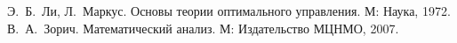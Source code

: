 


        
        
        \tableofcontents

        
        
        
        
        \begin{thebibliography}{9}
                Э.~Б.~Ли, Л.~Маркус. Основы теории оптимального управления. М: Наука, 1972.
                В.~А.~Зорич. Математический анализ. М: Издательство МЦНМО, 2007.
        \end{thebibliography}
